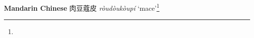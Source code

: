 \begin{etymology}\label{ety:roudoukoupi}
\textbf{Mandarin Chinese} {肉豆蔻皮} \textit{ròudòukòupí} `mace'\footnote{}
\end{etymology}
